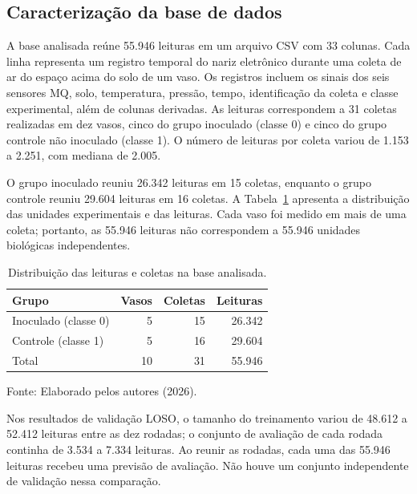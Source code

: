 \subsection{Caracterização da base de dados}
\label{subsec:caracterizacao_base_resultados}

A base analisada reúne 55.946 leituras em um arquivo CSV com 33 colunas.
Cada linha representa um registro temporal do nariz eletrônico durante
uma coleta de ar do espaço acima do solo de um vaso. Os registros incluem
os sinais dos seis sensores MQ, solo, temperatura, pressão, tempo,
identificação da coleta e classe experimental, além de colunas derivadas.
As leituras correspondem a 31 coletas realizadas em dez vasos, cinco do
grupo inoculado (classe 0) e cinco do grupo controle não inoculado
(classe 1). O número de leituras por coleta variou de 1.153 a 2.251,
com mediana de 2.005.

O grupo inoculado reuniu 26.342 leituras em 15 coletas, enquanto o grupo
controle reuniu 29.604 leituras em 16 coletas. A
Tabela~\ref{tab:distribuicao_base_resultados} apresenta a distribuição
das unidades experimentais e das leituras. Cada vaso foi medido em mais
de uma coleta; portanto, as 55.946 leituras não correspondem a 55.946
unidades biológicas independentes.

\begin{table}[htbp]
    \centering
    \caption{Distribuição das leituras e coletas na base analisada.}
    \label{tab:distribuicao_base_resultados}
    \begin{tabular}{lrrr}
        \hline
        Grupo & Vasos & Coletas & Leituras \\
        \hline
        Inoculado (classe 0) & 5 & 15 & 26.342 \\
        Controle (classe 1) & 5 & 16 & 29.604 \\
        \hline
        Total & 10 & 31 & 55.946 \\
        \hline
    \end{tabular}
    \vspace{0.1cm}
    {\footnotesize Fonte: Elaborado pelos autores (2026).}
\end{table}

Nos resultados de validação LOSO, o tamanho do treinamento variou de
48.612 a 52.412 leituras entre as dez rodadas; o conjunto de avaliação
de cada rodada continha de 3.534 a 7.334 leituras. Ao reunir as rodadas,
cada uma das 55.946 leituras recebeu uma previsão de avaliação.
Não houve um conjunto independente de validação nessa comparação.
